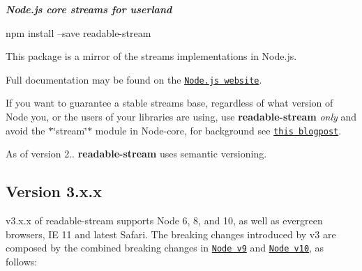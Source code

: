 {\itshape {\bfseries Node.\+js core streams for userland}} \href{https://travis-ci.com/nodejs/readable-stream}{\tt }

\href{https://nodei.co/npm/readable-stream/}{\tt } \href{https://nodei.co/npm/readable-stream/}{\tt }

\href{https://saucelabs.com/u/readabe-stream}{\tt }


\begin{DoxyCode}
npm install --save readable-stream
\end{DoxyCode}


This package is a mirror of the streams implementations in Node.\+js.

Full documentation may be found on the \href{https://nodejs.org/dist/v10.11.0/docs/api/stream.html}{\tt Node.\+js website}.

If you want to guarantee a stable streams base, regardless of what version of Node you, or the users of your libraries are using, use {\bfseries readable-\/stream} {\itshape only} and avoid the $\ast$\char`\"{}stream\char`\"{}$\ast$ module in Node-\/core, for background see \href{http://r.va.gg/2014/06/why-i-dont-use-nodes-core-stream-module.html}{\tt this blogpost}.

As of version 2.. {\bfseries readable-\/stream} uses semantic versioning.

\subsection*{Version 3.\+x.\+x}

v3.\+x.\+x of {\ttfamily readable-\/stream} supports Node 6, 8, and 10, as well as evergreen browsers, IE 11 and latest Safari. The breaking changes introduced by v3 are composed by the combined breaking changes in \href{https://nodejs.org/en/blog/release/v9.0.0/}{\tt Node v9} and \href{https://nodejs.org/en/blog/release/v10.0.0/}{\tt Node v10}, as follows\+:


